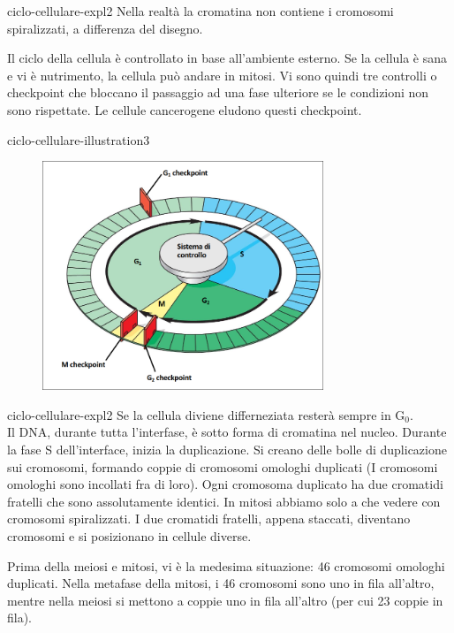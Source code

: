 \documentclass[preview]{standalone}
\begin{document}
\begin{snippet}{ciclo-cellulare-expl2}
    Nella realtà la cromatina non contiene i cromosomi spiralizzati, a differenza del disegno.

    Il ciclo della cellula è controllato in base all'ambiente esterno.
    Se la cellula è sana e vi è nutrimento, la cellula può andare in mitosi.
    Vi sono quindi tre controlli o checkpoint che bloccano il passaggio ad una fase ulteriore
    se le condizioni non sono rispettate.
    Le cellule cancerogene eludono questi checkpoint.
\end{snippet}

\begin{snippet}{ciclo-cellulare-illustration3}
    \begin{center}
    \begin{figure}[ht]
        \centering
        \includegraphics[width=0.75\textwidth]{./resources/ciclo_cellulare3}
    \end{figure}
    \end{center}
\end{snippet}

\begin{snippet}{ciclo-cellulare-expl2}
    Se la cellula diviene differneziata resterà sempre in G\({}_0\).
    \\
    Il DNA, durante tutta l'interfase, è sotto forma di cromatina nel nucleo.
    Durante la fase S dell'interface, inizia la duplicazione.
    Si creano delle bolle di duplicazione sui cromosomi, formando
    coppie di cromosomi omologhi duplicati (I cromosomi omologhi sono incollati fra di loro).
    Ogni cromosoma duplicato ha due cromatidi fratelli che sono assolutamente identici.
    In mitosi abbiamo solo a che vedere con cromosomi spiralizzati.
    I due cromatidi fratelli, appena staccati, diventano cromosomi e si posizionano in cellule diverse.

    Prima della meiosi e mitosi, vi è la medesima situazione: 46 cromosomi omologhi duplicati.
    Nella metafase della mitosi, i 46 cromosomi sono uno in fila all'altro,
    mentre nella meiosi si mettono a coppie uno in fila all'altro (per cui 23 coppie in fila).
\end{snippet}
\end{document}
